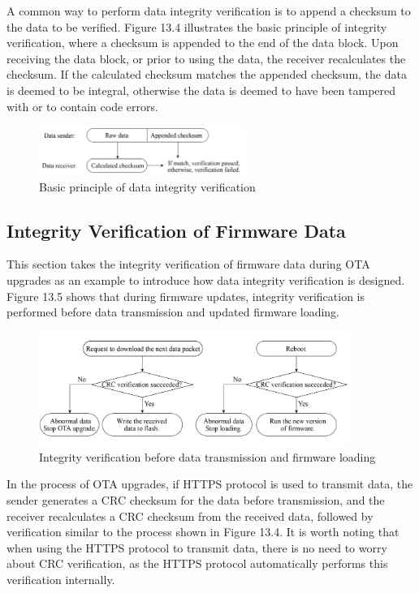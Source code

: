 \documentclass[a4paper,12pt,openany]{book}
\begin{document}
A common way to perform data integrity verification is to append a checksum to the data to be verified. Figure 13.4 illustrates the basic principle of integrity verification, where a checksum is appended to the end of the data block. Upon receiving the data block, or prior to using the data, the receiver recalculates the checksum. If the calculated checksum matches the appended checksum, the data is deemed to be integral, otherwise the data is deemed to have been tampered with or to contain code errors.

\begin{figure}[!h]
    \centering
    \includegraphics[width=0.6\textwidth]{D13Z/13-4}
    \caption{Basic principle of data integrity verification}
\end{figure}

\subsection{Integrity Verification of Firmware Data}
This section takes the integrity verification of firmware data during OTA upgrades as an example to introduce how data integrity verification is designed. Figure 13.5 shows that during firmware updates, integrity verification is performed before data transmission and updated firmware loading.

\begin{figure}[!h]
    \centering
    \includegraphics[width=0.9\textwidth]{D13Z/13-5}
    \caption{Integrity verification before data transmission and firmware loading}
\end{figure}

In the process of OTA upgrades, if HTTPS protocol is used to transmit data, the sender generates a CRC checksum for the data before transmission, and the receiver recalculates a CRC checksum from the received data, followed by verification similar to the process shown in Figure 13.4. It is worth noting that when using the HTTPS protocol to transmit data, there is no need to worry about CRC verification, as the HTTPS protocol automatically performs this verification internally.
\end{document}
